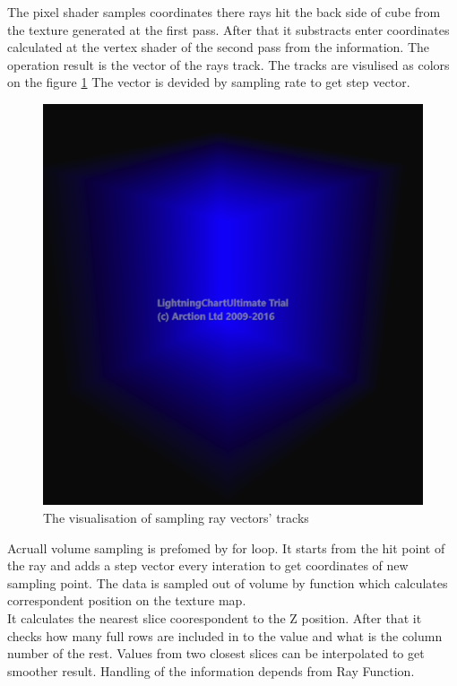 \documentclass[twoside, english, 11pt]{report}
\begin{document}
The pixel shader samples coordinates there rays hit the back side of cube from the texture generated at the first pass. After that it substracts enter coordinates calculated at the vertex shader of the second pass from the information. The operation result is the vector of the rays track. The tracks are visulised as colors on the figure \ref{fig:final} The vector is devided by sampling rate to get step vector. 
\begin{figure}[!h]
\centerline{\includegraphics[scale = 0.5]{img/final}}
\caption{The visualisation of sampling ray vectors' tracks \label{fig:final}}
\end{figure}
Acruall volume sampling is prefomed by for loop. It starts from the hit point of the ray and adds a step vector every interation to get coordinates of new sampling point. The data is sampled out of volume by function which calculates correspondent position on the texture map.\\

It calculates the nearest slice coorespondent to the Z position. After that it checks how many full rows are included in to the value and what is the column number of the rest. Values from two closest slices can be interpolated to get smoother result. Handling of the information depends from Ray Function.\\
\end{document}
